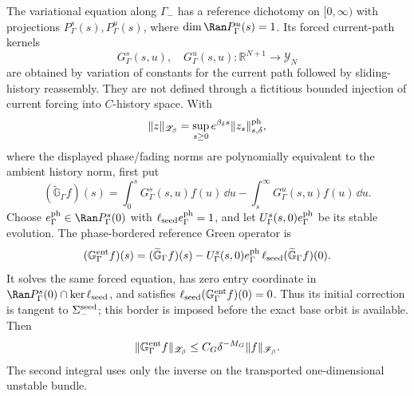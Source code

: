 \begin{lemma}
The variational equation along \(\Gamma_-\) has a reference dichotomy on
\([0,\infty)\) with projections
\(P_\Gamma^s(s),P_\Gamma^u(s)\), where
\(\dim\Ran P_\Gamma^u(s)=1\).  Its forced
current-path kernels
\[
 G_{\Gamma}^s(s,u),\quad G_{\Gamma}^u(s,u):
       \mathbb R^{N+1}\longrightarrow\mathscr Y_N
\]
are obtained by variation of constants for the current path followed by
sliding-history reassembly.  They are not defined through a fictitious
bounded injection of current forcing into \(C\)-history space.  With
\begin{equation}
 \|z\|_{\mathscr Z_\beta}
 =\sup_{s\ge0}e^{\beta_\delta s}
       \|z_s\|_{s,\delta}^{\rm ph},                   \label{eq:anchor-half-line-solution-norm}
\end{equation}
where the displayed phase/fading norms are polynomially equivalent to the
ambient history norm, first put
\begin{equation}
 (\widetilde{\mathbb G}_\Gamma f)(s)
 =\int_0^sG_\Gamma^s(s,u)f(u)\,\dd u
  -\int_s^\infty G_\Gamma^u(s,u)f(u)\,\dd u.          \label{eq:anchor-reference-mixed-Green}
\end{equation}
Choose
\(e_\Gamma^{\rm ph}\in\Ran P_\Gamma^s(0)\) with
\(\ell_{\rm seed}e_\Gamma^{\rm ph}=1\), and let
\(U_\Gamma^s(s,0)e_\Gamma^{\rm ph}\) be its stable evolution.  The
phase-bordered reference Green operator is
\begin{equation}
 (\mathbb G_\Gamma^{\rm ent}f)(s)
 =(\widetilde{\mathbb G}_\Gamma f)(s)
 -U_\Gamma^s(s,0)e_\Gamma^{\rm ph}\,
      \ell_{\rm seed}(\widetilde{\mathbb G}_\Gamma f)(0).        \label{eq:anchor-reference-phase-border}
\end{equation}
It solves the same forced equation, has zero entry coordinate in
\(\Ran P_\Gamma^s(0)\cap\ker\ell_{\rm seed}\), and satisfies
\(\ell_{\rm seed}(\mathbb G_\Gamma^{\rm ent}f)(0)=0\).  Thus its initial
correction is tangent to \(\Sigma_-^{\rm seed}\); this border is imposed
before the exact base orbit is available.
Then
\begin{equation}
 \|\mathbb G_\Gamma^{\rm ent} f\|_{\mathscr Z_\beta}
 \le C_G\delta^{-M_G}\|f\|_{\mathscr F_\beta}.        \label{eq:anchor-reference-Green-bound}
\end{equation}
The second integral uses only the inverse on the transported
one-dimensional unstable bundle.


\end{lemma}
